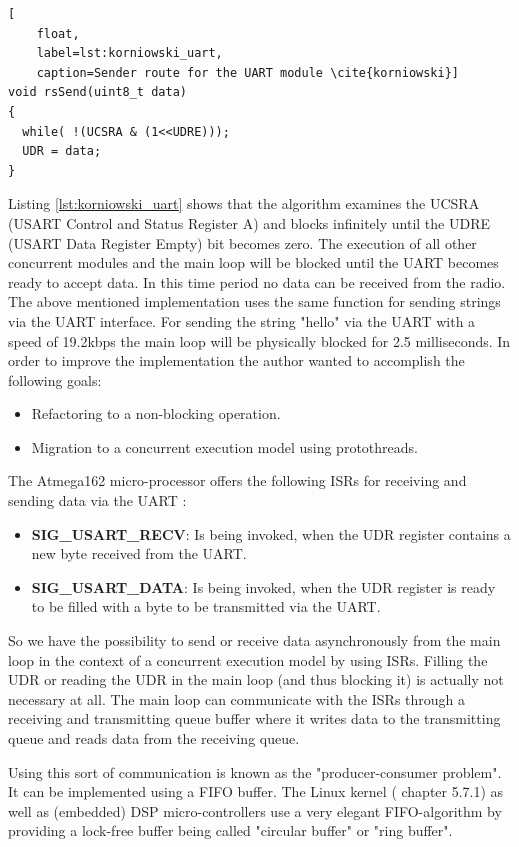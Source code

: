 \begin{lstlisting}[
	float,
	label=lst:korniowski_uart,
	caption=Sender route for the UART module \cite{korniowski}]
void rsSend(uint8_t data)
{
  while( !(UCSRA & (1<<UDRE)));
  UDR = data;
}
\end{lstlisting}

Listing \ref{lst:korniowski_uart} shows that the algorithm examines the UCSRA (USART Control and Status Register A) and blocks infinitely until the UDRE (USART Data Register Empty) bit becomes zero. The execution of all other concurrent modules and the main loop will be blocked until the UART becomes ready to accept data. In this time period no data can be received from the radio. The above mentioned implementation uses the same function for sending strings via the UART interface. For sending the string "hello" via the UART with a speed of 19.2kbps the main loop will be physically blocked for 2.5 milliseconds. In order to improve the implementation the author wanted to accomplish the following goals:

\begin{itemize}
\item Refactoring to a non-blocking operation.
\item Migration to a concurrent execution model using protothreads.
\end{itemize}

The Atmega162 micro-processor offers the following ISRs for receiving and sending data via the UART \cite{atmega162datasheet}:

\begin{itemize}
\item \textbf{SIG\_USART\_RECV}: Is being invoked, when the UDR register contains a new byte received from the UART.
\item \textbf{SIG\_USART\_DATA}: Is being invoked, when the UDR register is ready to be filled with a byte to be transmitted via the UART.
\end{itemize}

So we have the possibility to send or receive data asynchronously from the main loop in the context of a concurrent execution model by using ISRs. Filling the UDR or reading the UDR in the main loop (and thus blocking it) is actually not necessary at all. The main loop can communicate with the ISRs through a receiving and transmitting queue buffer where it writes data to the transmitting queue and reads data from the receiving queue.

Using this sort of communication is known as the "producer-consumer problem". It can be implemented using a FIFO buffer. The Linux kernel (\cite{linux_device_drivers} chapter 5.7.1) as well as (embedded) DSP micro-controllers \cite{ti_dsp} use a very elegant FIFO-algorithm by providing a lock-free buffer being called "circular buffer" or "ring buffer".

